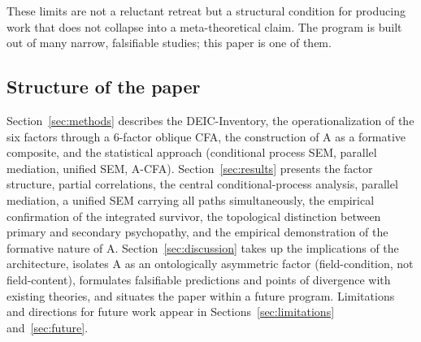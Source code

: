 These limits are not a reluctant retreat but a structural condition for producing work that does not collapse into a meta-theoretical claim. The program is built out of many narrow, falsifiable studies; this paper is one of them.

\subsection{Structure of the paper}

Section~\ref{sec:methods} describes the DEIC-Inventory, the operationalization of the six factors through a 6-factor oblique CFA, the construction of A as a formative composite, and the statistical approach (conditional process SEM, parallel mediation, unified SEM, A-CFA). Section~\ref{sec:results} presents the factor structure, partial correlations, the central conditional-process analysis, parallel mediation, a unified SEM carrying all paths simultaneously, the empirical confirmation of the integrated survivor, the topological distinction between primary and secondary psychopathy, and the empirical demonstration of the formative nature of A. Section~\ref{sec:discussion} takes up the implications of the architecture, isolates A as an ontologically asymmetric factor (field-condition, not field-content), formulates falsifiable predictions and points of divergence with existing theories, and situates the paper within a future program. Limitations and directions for future work appear in Sections~\ref{sec:limitations} and~\ref{sec:future}.
